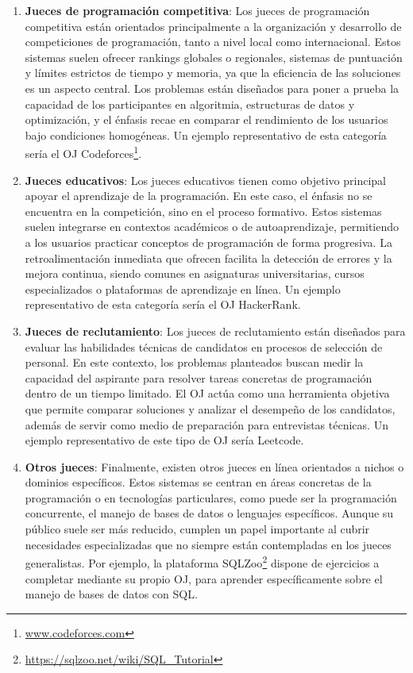  \begin{enumerate}
     \item \textbf{Jueces de programación competitiva}: Los jueces de programación competitiva están orientados principalmente a la organización y desarrollo de competiciones de programación, tanto a nivel local como internacional. Estos sistemas suelen ofrecer rankings globales o regionales, sistemas de puntuación y límites estrictos de tiempo y memoria, ya que la eficiencia de las soluciones es un aspecto central. Los problemas están diseñados para poner a prueba la capacidad de los participantes en algoritmia, estructuras de datos y optimización, y el énfasis recae en comparar el rendimiento de los usuarios bajo condiciones homogéneas. Un ejemplo representativo de esta categoría sería el OJ Codeforces\footnote{\url{www.codeforces.com}}. 
     \item \textbf{Jueces educativos}: Los jueces educativos tienen como objetivo principal apoyar el aprendizaje de la programación. En este caso, el énfasis no se encuentra en la competición, sino en el proceso formativo. Estos sistemas suelen integrarse en contextos académicos o de autoaprendizaje, permitiendo a los usuarios practicar conceptos de programación de forma progresiva. La retroalimentación inmediata que ofrecen facilita la detección de errores y la mejora continua, siendo comunes en asignaturas universitarias, cursos especializados o plataformas de aprendizaje en línea. Un ejemplo representativo de esta categoría sería el OJ HackerRank. 
     \item \textbf{Jueces de reclutamiento}: Los jueces de reclutamiento están diseñados para evaluar las habilidades técnicas de candidatos en procesos de selección de personal. En este contexto, los problemas planteados buscan medir la capacidad del aspirante para resolver tareas concretas de programación dentro de un tiempo limitado. El OJ actúa como una herramienta objetiva que permite comparar soluciones y analizar el desempeño de los candidatos, además de servir como medio de preparación para entrevistas técnicas. Un ejemplo representativo de este tipo de OJ sería Leetcode. 
     \item \textbf{Otros jueces}: Finalmente, existen otros jueces en línea orientados a nichos o dominios específicos. Estos sistemas se centran en áreas concretas de la programación o en tecnologías particulares, como puede ser la programación concurrente, el manejo de bases de datos o lenguajes específicos. Aunque su público suele ser más reducido, cumplen un papel importante al cubrir necesidades especializadas que no siempre están contempladas en los jueces generalistas. Por ejemplo, la plataforma SQLZoo\footnote{\url{https://sqlzoo.net/wiki/SQL_Tutorial}} dispone de ejercicios a completar mediante su propio OJ, para aprender específicamente sobre el manejo de bases de datos con SQL. 
 \end{enumerate}

